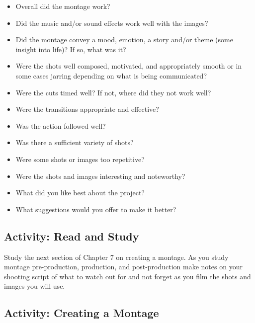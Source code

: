 \documentclass[
]{book}
\providecommand{\tightlist}{%
  \setlength{\itemsep}{0pt}\setlength{\parskip}{0pt}}
\begin{document}
\begin{itemize}
\tightlist
\item
  Overall did the montage work?
\item
  Did the music and/or sound effects work well with the images?
\item
  Did the montage convey a mood, emotion, a story and/or theme (some insight into life)? If so, what was it?
\item
  Were the shots well composed, motivated, and appropriately smooth or in some cases jarring depending on what is being communicated?
\item
  Were the cuts timed well? If not, where did they not work well?
\item
  Were the transitions appropriate and effective?
\item
  Was the action followed well?
\item
  Was there a sufficient variety of shots?
\item
  Were some shots or images too repetitive?
\item
  Were the shots and images interesting and noteworthy?
\item
  What did you like best about the project?
\item
  What suggestions would you offer to make it better?
\end{itemize}

\hypertarget{activity-read-and-study-3}{%
\subsection*{Activity: Read and Study}\label{activity-read-and-study-3}}

\begin{reflect}
Study the next section of Chapter 7 on creating a montage. As you study montage pre-production, production, and post-production make notes on your shooting script of what to watch out for and not forget as you film the shots and images you will use.
\end{reflect}

\hypertarget{activity-creating-a-montage}{%
\subsection*{Activity: Creating a Montage}\label{activity-creating-a-montage}}
\end{document}
